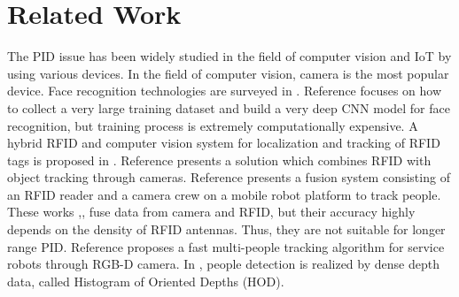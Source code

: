 \chapter{Related Work}
\label{ch:relatedwork}
The PID issue has been widely studied in the field of computer vision and IoT by using various devices. In the field of computer vision, camera is the most popular device. Face recognition technologies are surveyed in \cite{zhao2003face}. Reference \cite{parkhi2015deep} focuses on how to collect a very large training dataset and build a very deep CNN model for face recognition, but training process is extremely computationally expensive. A hybrid RFID and computer vision system for localization and tracking of RFID tags is proposed in \cite{goller2014fusing}. Reference \cite{isasi2010location} presents a solution which combines RFID with object tracking through cameras. Reference \cite{germa2010vision} presents a fusion system consisting of an RFID reader and a camera crew on a mobile robot platform to track people. These works \cite{goller2014fusing},\cite{isasi2010location},\cite{germa2010vision} fuse data from camera and RFID, but their accuracy highly depends on the density of RFID antennas. Thus, they are not suitable for longer range PID. Reference \cite{munaro2014fast} proposes a fast multi-people tracking algorithm for service robots through RGB-D camera. In \cite{spinello2011people}, people detection is realized by dense depth data, called Histogram of Oriented Depths (HOD). 